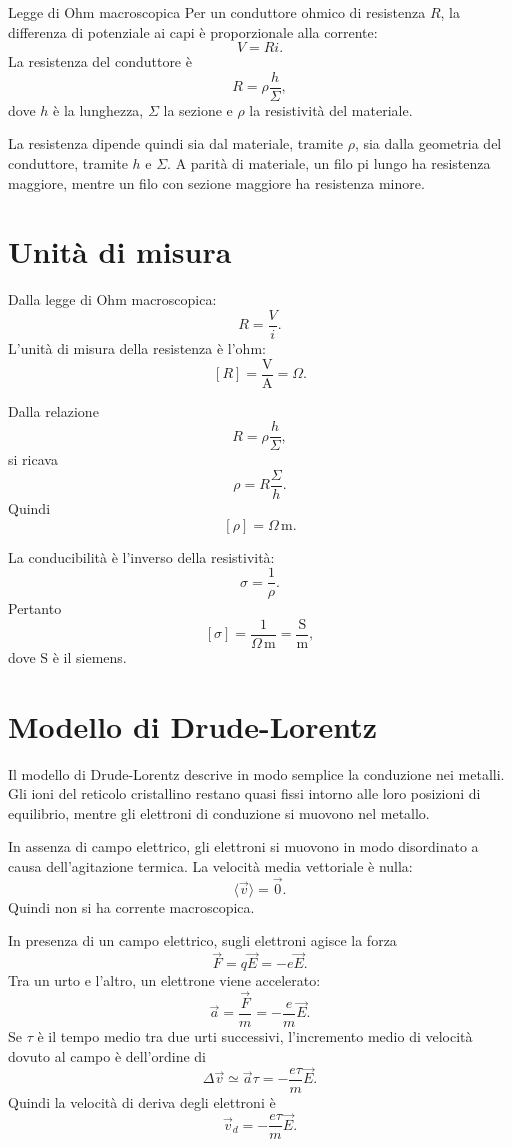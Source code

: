 \documentclass[a4paper]{article}
\begin{document}
\begin{snippettheorem}{Legge di Ohm macroscopica}
    Per un conduttore ohmico di resistenza \(R\), la differenza di potenziale ai capi è proporzionale alla corrente:
    \[
        V=Ri.
    \]
    La resistenza del conduttore è
    \[
        R=\rho\frac{h}{\Sigma},
    \]
    dove \(h\) è la lunghezza, \(\Sigma\) la sezione e \(\rho\) la resistività del materiale.
\end{snippettheorem}

La resistenza dipende quindi sia dal materiale, tramite \(\rho\), sia dalla geometria del conduttore, tramite \(h\) e \(\Sigma\). A parità di materiale, un filo pi lungo ha resistenza maggiore, mentre un filo con sezione maggiore ha resistenza minore.

\section{Unità di misura}

Dalla legge di Ohm macroscopica:
\[
    R=\frac{V}{i}.
\]
L'unità di misura della resistenza è l'ohm:
\[
    [R]=\frac{\mathrm{V}}{\mathrm{A}}=\Omega.
\]

Dalla relazione
\[
    R=\rho\frac{h}{\Sigma},
\]
si ricava
\[
    \rho=R\frac{\Sigma}{h}.
\]
Quindi
\[
    [\rho]=\Omega\,\mathrm{m}.
\]

La conducibilità è l'inverso della resistività:
\[
    \sigma=\frac{1}{\rho}.
\]
Pertanto
\[
    [\sigma]=\frac{1}{\Omega\,\mathrm{m}}=\frac{\mathrm{S}}{\mathrm{m}},
\]
dove \(\mathrm{S}\) è il siemens.

\section{Modello di Drude-Lorentz}

Il modello di Drude-Lorentz descrive in modo semplice la conduzione nei metalli. Gli ioni del reticolo cristallino restano quasi fissi intorno alle loro posizioni di equilibrio, mentre gli elettroni di conduzione si muovono nel metallo.

In assenza di campo elettrico, gli elettroni si muovono in modo disordinato a causa dell'agitazione termica. La velocità media vettoriale è nulla:
\[
    \langle\vec{v}\rangle=\vec{0}.
\]
Quindi non si ha corrente macroscopica.

In presenza di un campo elettrico, sugli elettroni agisce la forza
\[
    \vec{F}=q\vec{E}=-e\vec{E}.
\]
Tra un urto e l'altro, un elettrone viene accelerato:
\[
    \vec{a}=\frac{\vec{F}}{m}=-\frac{e}{m}\vec{E}.
\]
Se \(\tau\) è il tempo medio tra due urti successivi, l'incremento medio di velocità dovuto al campo è dell'ordine di
\[
    \Delta\vec{v}\simeq\vec{a}\tau=-\frac{e\tau}{m}\vec{E}.
\]
Quindi la velocità di deriva degli elettroni è
\[
    \vec{v}_d=-\frac{e\tau}{m}\vec{E}.
\]
\end{document}
